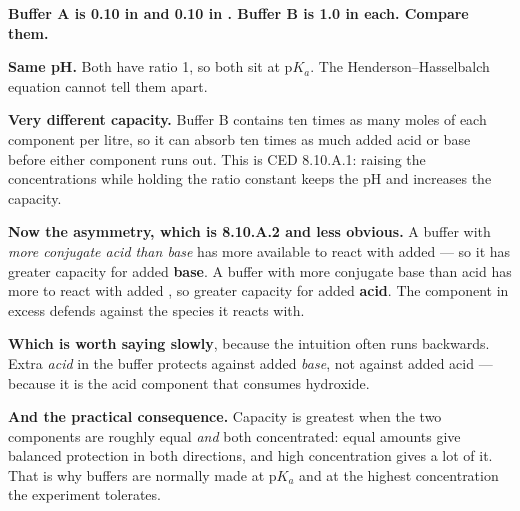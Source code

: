 \documentclass{apchem-worksheet}
\begin{document}
\begin{workedexample}
\textbf{Buffer A is \SI{0.10}{\Molar} in  and
\SI{0.10}{\Molar} in . Buffer B is \SI{1.0}{\Molar} in each.
Compare them.}

\textbf{Same pH.} Both have ratio 1, so both sit at p$K_{a}$. The
Henderson--Hasselbalch equation cannot tell them apart.

\textbf{Very different capacity.} Buffer B contains ten times as many
moles of each component per litre, so it can absorb ten times as much
added acid or base before either component runs out. This is CED
8.10.A.1: raising the concentrations while holding the ratio constant
keeps the pH and increases the capacity.

\textbf{Now the asymmetry, which is 8.10.A.2 and less obvious.} A
buffer with \emph{more conjugate acid than base} has more 
available to react with added  --- so it has greater capacity
for added \textbf{base}. A buffer with more conjugate base than acid has
more  to react with added , so greater capacity for added
\textbf{acid}. The component in excess defends against the species it
reacts with.

\textbf{Which is worth saying slowly}, because the intuition often runs
backwards. Extra \emph{acid} in the buffer protects against added
\emph{base}, not against added acid --- because it is the acid
component that consumes hydroxide.

\textbf{And the practical consequence.} Capacity is greatest when the
two components are roughly equal \emph{and} both concentrated: equal
amounts give balanced protection in both directions, and high
concentration gives a lot of it. That is why buffers are normally made
at p$K_{a}$ and at the highest concentration the experiment tolerates.
\end{workedexample}
\end{document}

